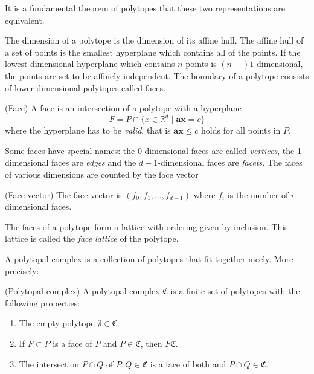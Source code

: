 It is a fundamental theorem of polytopes that these two representations are 
equivalent.

The dimension of a polytope is the dimension of its affine hull. The affine 
hull of a set of points is the smallest hyperplane which contains all of the 
points. If the lowest dimensional hyperplane which contains $n$ points is 
$(n-)1$-dimensional, the points are set to be affinely independent. The 
boundary 
of a polytope consists of lower dimensional polytopes called faces. 
\begin{definition}
 (Face) A face is an intersection of a polytope with a hyperplane 
\begin{equation}
 F = P \cap \{x \in \mathbb{R}^d \mid \mathbf{a}\mathbf{x} = c\}
\end{equation}
where the hyperplane has to be \textit{valid}, that is $\mathbf{a}\mathbf{x} 
\leq c$ holds for all points in $P$. 

\end{definition}

Some faces have special names: the 0-dimensional faces are called 
\textit{vertices}, the 1-dimensional faces are \textit{edges} and the 
$d-1$-dimensional faces are \textit{facets}. The faces of various dimensions 
are counted by the face vector
\begin{definition}
 (Face vector) The face vector is $(f_0, f_1, \dots, f_{d-1})$ where $f_i$ is 
the number of $i$-dimensional faces.
\end{definition}
 The faces of a polytope 
form a lattice with ordering given by inclusion. This lattice is called the 
\textit{face lattice} of the polytope.

A polytopal complex is a collection of polytopes that fit together nicely.
More precisely:
\begin{definition}
 (Polytopal complex) A polytopal complex $\mathfrak{C}$ is a finite set of 
polytopes with the following properties:
\begin{enumerate}
 \item The empty polytope $\emptyset \in \mathfrak{C}$.
  \item If $F \subset P$ is a face of $P$ and $P \in \mathfrak{C}$, then 
$F\mathfrak{C}$.
\item The intersection $P\cap Q$ of $P,Q \in \mathfrak{C}$ is a face of both 
and $P\cap Q \in \mathfrak{C}$.
\end{enumerate}

\end{definition}

